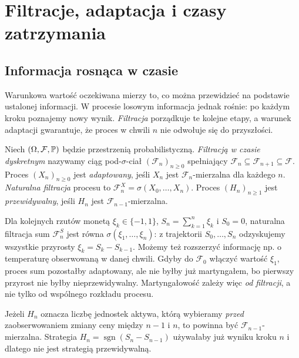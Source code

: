 \chapter{Filtracje, adaptacja i czasy zatrzymania}
\label{ch:filtracje}

\section{Informacja rosnąca w czasie}

Warunkowa wartość oczekiwana mierzy to, co można
przewidzieć na podstawie ustalonej informacji.
W procesie losowym informacja jednak rośnie:
po każdym kroku poznajemy nowy wynik. \emph{Filtracja}
porządkuje te kolejne etapy, a warunek adaptacji
gwarantuje, że proces w chwili $n$ nie odwołuje się
do przyszłości.

\begin{definicja}
Niech $(\Omega,\mathcal F,\mathbb{P})$ będzie przestrzenią
probabilistyczną. \emph{Filtracją w czasie dyskretnym}
nazywamy ciąg pod-$\sigma$-ciał
$(\mathcal F_n)_{n\geq0}$ spełniający
$\mathcal F_n\subseteq\mathcal F_{n+1}\subseteq\mathcal F$.
Proces $(X_n)_{n\geq0}$ jest \emph{adaptowany}, jeśli
$X_n$ jest $\mathcal F_n$-mierzalna dla każdego $n$.
\emph{Naturalna filtracja} procesu to
$\mathcal F_n^X=\sigma(X_0,\ldots,X_n)$.
Proces $(H_n)_{n\geq1}$ jest \emph{przewidywalny},
jeśli $H_n$ jest $\mathcal F_{n-1}$-mierzalna.
\end{definicja}

\begin{przyklad}
Dla kolejnych rzutów monetą $\xi_k\in\{-1,1\}$,
$S_n=\sum_{k=1}^n\xi_k$ i $S_0=0$, naturalna
filtracja sum $\mathcal F_n^S$ jest równa
$\sigma(\xi_1,\ldots,\xi_n)$: z trajektorii
$S_0,\ldots,S_n$ odzyskujemy wszystkie przyrosty
$\xi_k=S_k-S_{k-1}$. Możemy też rozszerzyć informację
np. o temperaturę obserwowaną w danej chwili.
Gdyby do $\mathcal F_0$ włączyć wartość
$\xi_1$, proces sum pozostałby adaptowany, ale
nie byłby już martyngałem, bo pierwszy przyrost
nie byłby nieprzewidywalny. Martyngałowość
zależy więc \emph{od filtracji}, a nie tylko od
wspólnego rozkładu procesu.
\end{przyklad}

\begin{przyklad}
Jeżeli $H_n$ oznacza liczbę jednostek aktywa,
którą wybieramy \emph{przed} zaobserwowaniem
zmiany ceny między $n-1$ i $n$, to powinna być
$\mathcal F_{n-1}$-mierzalna. Strategia
$H_n=\operatorname{sgn}(S_n-S_{n-1})$ używałaby
już wyniku kroku $n$ i dlatego nie jest
strategią przewidywalną.
\end{przyklad}


